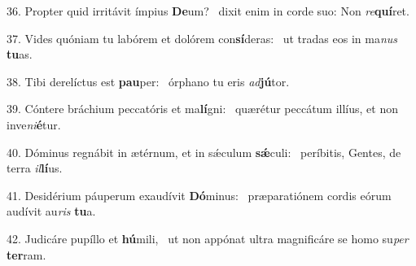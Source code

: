 36. Propter quid irritávit ímpius \textbf{De}um? \ast\  dixit enim in corde suo: Non \textit{re}\textbf{quí}ret.\

37. Vides quóniam tu labórem et dolórem con\textbf{sí}deras: \ast\  ut tradas eos in ma\textit{nus} \textbf{tu}as.\

38. Tibi derelíctus est \textbf{pau}per: \ast\  órphano tu eris \textit{ad}\textbf{jú}tor.\

39. Cóntere bráchium peccatóris et ma\textbf{lí}gni: \ast\  quærétur peccátum illíus, et non inve\textit{ni}\textbf{é}tur.\

40. Dóminus regnábit in ætérnum, et in sǽculum \textbf{sǽ}culi: \ast\  períbitis, Gentes, de terra \textit{il}\textbf{lí}us.\

41. Desidérium páuperum exaudívit \textbf{Dó}minus: \ast\  præparatiónem cordis eórum audívit au\textit{ris} \textbf{tu}a.\

42. Judicáre pupíllo et \textbf{hú}mili, \ast\  ut non appónat ultra magnificáre se homo su\textit{per} \textbf{ter}ram.\

